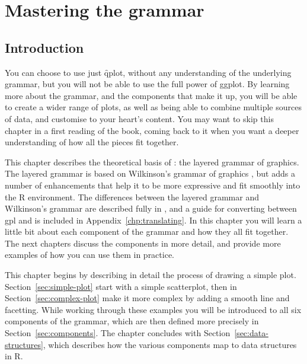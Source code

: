 

% 


\chapter{Mastering the grammar}
\label{cha:mastery}

\section{Introduction}

You can choose to use just \f{qplot}, without any understanding of the underlying grammar, but you will not be able to use the full power of ggplot.  By learning more about the grammar, and the components that make it up, you will be able to create a wider range of plots, as well as being able to combine multiple sources of data, and customise to your heart's content.  You may want to skip this chapter in a first reading of the book, coming back to it when you want a deeper understanding of how all the pieces fit together.

This chapter describes the theoretical basis of \ggplot: the layered grammar of graphics.  The layered grammar is based on Wilkinson's grammar of graphics \citep{wilkinson:2006}, but adds a number of enhancements that help it to be more expressive and fit smoothly into the R environment.  The differences between the layered grammar and Wilkinson's grammar are described fully in \citep{wickham:2008}, and a guide for converting between {\sc gpl} and \ggplot is included in Appendix~\ref{chp:translating}.  In this chapter you will learn a little bit about each component of the grammar and how they all fit together.  The next chapters discuss the components in more detail, and provide more examples of how you can use them in practice.

This chapter begins by describing in detail the process of drawing a simple plot.  Section~\ref{sec:simple-plot} start with a simple scatterplot, then in Section~\ref{sec:complex-plot} make it more complex by adding a smooth line and facetting.  While working through these examples you will be introduced to all six components of the grammar, which are then defined more precisely in Section~\ref{sec:components}.  The chapter concludes with Section~\ref{sec:data-structures}, which describes how the various components map to data structures in R.  

